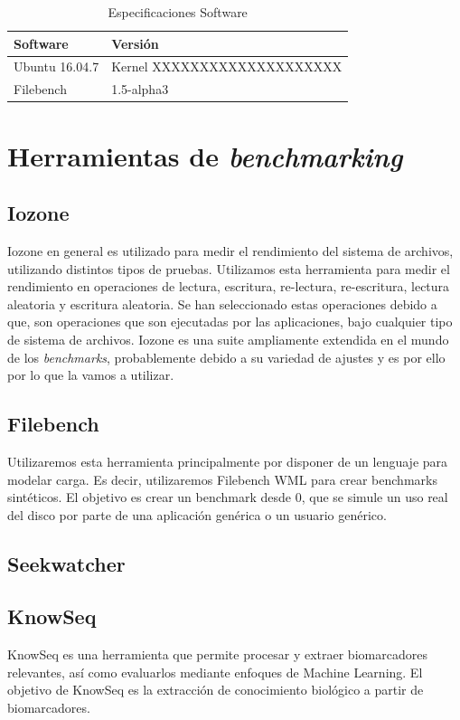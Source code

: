 \begin{table}
    \centering
    \begin{tabular}{|l|l|}
    \hline
        Software & Versión \\ \hline\hline
        Ubuntu 16.04.7 & Kernel XXXXXXXXXXXXXXXXXXXX \\ \hline
        Filebench & 1.5-alpha3 \\ \hline
    \end{tabular}
    \caption{Especificaciones Software}
\label{table:2}
\end{table}

\section{Herramientas de \textit{benchmarking}}
\subsection{Iozone}
Iozone en general es utilizado para medir el rendimiento del sistema de archivos, utilizando distintos tipos de pruebas. Utilizamos esta herramienta para medir el rendimiento en operaciones de lectura, escritura, re-lectura, re-escritura, lectura aleatoria y escritura aleatoria. Se han seleccionado estas operaciones debido a que, son operaciones que son ejecutadas por las aplicaciones, bajo cualquier tipo de sistema de archivos. Iozone es una suite ampliamente extendida en el mundo de los \textit{benchmarks}, probablemente debido a su variedad de ajustes y es por ello por lo que la vamos a utilizar.
\subsection{Filebench}
Utilizaremos esta herramienta principalmente por disponer de un lenguaje para modelar carga. Es decir, utilizaremos Filebench WML para crear benchmarks sintéticos. El objetivo es crear un benchmark desde 0, que se simule un uso real del disco por parte de una aplicación genérica o un usuario genérico. 
\subsection{Seekwatcher}

\subsection{KnowSeq}

KnowSeq es una herramienta que permite procesar y extraer biomarcadores relevantes, así como evaluarlos mediante enfoques de Machine Learning. El objetivo de KnowSeq es la extracción de conocimiento biológico a partir de biomarcadores. 

